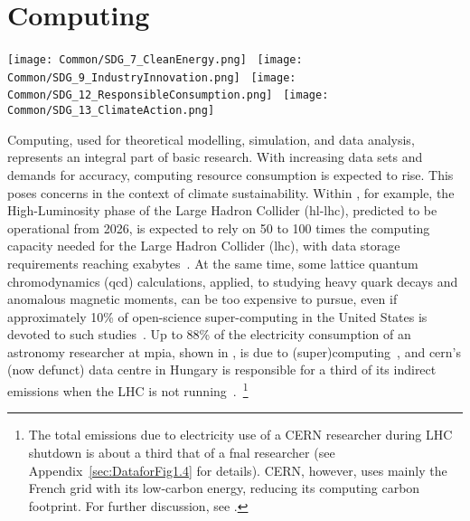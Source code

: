 \documentclass[../SustainableHEP.tex]{subfiles}
\begin{document}
\RaggedRight
\sloppy
\newpage


\section{Computing}
\label{sec:Computing}


\begin{center}
\texttt{[image: Common/SDG\_7\_CleanEnergy.png]}~%
\texttt{[image: Common/SDG\_9\_IndustryInnovation.png]}~%
\texttt{[image: Common/SDG\_12\_ResponsibleConsumption.png]}~%
\texttt{[image: Common/SDG\_13\_ClimateAction.png]}
\end{center}


\exSum

\noindent Computing, used for theoretical modelling, simulation, and data analysis, represents an integral part of basic research. With increasing data sets and demands for accuracy, computing resource consumption is expected to rise. 
This poses concerns in the context of climate sustainability. 
Within \ACR, for example, the High-Luminosity phase of the Large Hadron Collider (\acrshort{hl-lhc}), predicted to be operational from 2026, is expected to rely on 50 to 100 times the computing capacity needed for the Large Hadron Collider (\acrshort{lhc}), with data storage requirements reaching exabytes~\cite{CERN_computing_webpage}. 
At the same time, some lattice quantum chromodynamics  (\acrshort{qcd}) calculations, applied, \eg to studying heavy quark decays and anomalous magnetic moments, can be too expensive to pursue, even if approximately 10\% of open-science super-computing in the United States is devoted to such studies~\cite{Shanahan}.
Up to 88\% of the electricity consumption of an astronomy researcher at \acrshort{mpia}, shown in , is due to (super)computing~\cite{Jahnke2020}, and \acrshort{cern}'s (now defunct) data centre in Hungary is responsible for a third of its indirect emissions when the LHC is not running~\cite{Environment:2737239}.~\footnote{The total emissions due to electricity use of a CERN researcher during LHC shutdown is about a third that of a \acrshort{fnal} researcher (see Appendix~\ref{sec:DataforFig1.4} for details). CERN, however, uses mainly the French grid with its low-carbon energy, reducing its computing carbon footprint. For further discussion, see .}
\end{document}

